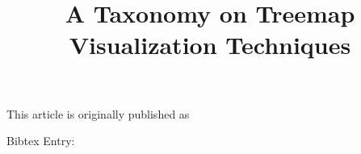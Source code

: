 \documentclass[]{cgspreprint}
\title{A Taxonomy on Treemap Visualization Techniques}
\begin{document}


\maketitle

\noindent This article is originally published as

\medskip
\noindent Bibtex Entry:

\end{document}

